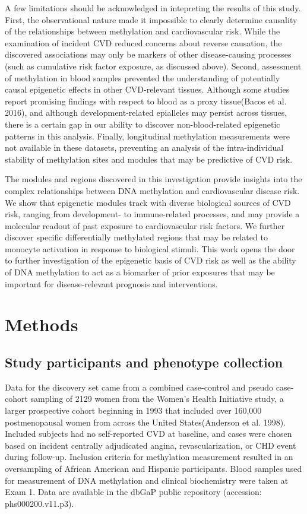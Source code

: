 \documentclass[]{article}
\theoremstyle{definition}
\theoremstyle{definition}
\theoremstyle{definition}
\theoremstyle{remark}
\begin{document}
A few limitations should be acknowledged in intepreting the results of
this study. First, the observational nature made it impossible to
clearly determine causality of the relationships between methylation and
cardiovascular risk. While the examination of incident CVD reduced
concerns about reverse causation, the discovered associations may only
be markers of other disease-causing processes (such as cumulative risk
factor exposure, as discussed above). Second, assessment of methylation
in blood samples prevented the understanding of potentially causal
epigenetic effects in other CVD-relevant tissues. Although some studies
report promising findings with respect to blood as a proxy tissue(Bacos
et al. 2016), and although development-related epialleles may persist
across tissues, there is a certain gap in our ability to discover
non-blood-related epigenetic patterns in this analysis. Finally,
longitudinal methylation measurements were not available in these
datasets, preventing an analysis of the intra-individual stability of
methylation sites and modules that may be predictive of CVD risk.

The modules and regions discovered in this investigation provide
insights into the complex relationships between DNA methylation and
cardiovascular disease risk. We show that epigenetic modules track with
diverse biological sources of CVD risk, ranging from development- to
immune-related processes, and may provide a molecular readout of past
exposure to cardiovascular risk factors. We further discover specific
differentially methylated regions that may be related to monocyte
activation in response to biological stimuli. This work opens the door
to further investigation of the epigenetic basis of CVD risk as well as
the ability of DNA methylation to act as a biomarker of prior exposures
that may be important for disease-relevant prognosis and interventions.

\section{Methods}\label{methods}

\subsection{Study participants and phenotype
collection}\label{study-participants-and-phenotype-collection}

Data for the discovery set came from a combined case-control and pseudo
case-cohort sampling of 2129 women from the Women's Health Initiative
study, a larger prospective cohort beginning in 1993 that included over
160,000 postmenopausal women from across the United States(Anderson et
al. 1998). Included subjects had no self-reported CVD at baseline, and
cases were chosen based on incident centrally adjudicated angina,
revascularization, or CHD event during follow-up. Inclusion criteria for
methylation measurement resulted in an oversampling of African American
and Hispanic participants. Blood samples used for measurement of DNA
methylation and clinical biochemistry were taken at Exam 1. Data are
available in the dbGaP public repository (accession: phs000200.v11.p3).
\end{document}
